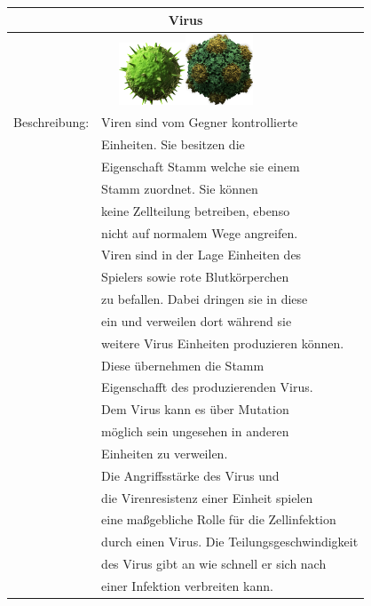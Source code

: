 \documentclass[11pt]{article}
\begin{document}
\begin{tabular}{|r|l|}
\hline
\multicolumn{2}{c}{Virus}\\\hline\hline
\multicolumn{2}{c}{\includegraphics[width=2cm]{virusaorig.png}\quad\quad\includegraphics[width=2cm]{virusborig.png}}\\\hline\hline
Beschreibung:	& Viren sind vom Gegner kontrollierte\\
			& Einheiten. Sie besitzen die\\
			& Eigenschaft Stamm welche sie einem\\
			& Stamm zuordnet. Sie k\"onnen\\
			& keine Zellteilung betreiben, ebenso\\
			& nicht auf normalem Wege angreifen.\\
			& Viren sind in der Lage Einheiten des\\
			& Spielers sowie rote Blutk\"orperchen\\
			& zu befallen. Dabei dringen sie in diese\\
			& ein und verweilen dort w\"ahrend sie\\
			& weitere Virus Einheiten produzieren können.\\
			& Diese \"ubernehmen die Stamm\\
			& Eigenschafft des produzierenden Virus.\\
			& Dem Virus kann es \"uber Mutation\\
			& m\"oglich sein ungesehen in anderen\\
			& Einheiten zu verweilen.\\
			& Die Angriffsst\"arke des Virus und\\
			& die Virenresistenz einer Einheit spielen\\
			& eine maßgebliche Rolle f\"ur die Zellinfektion\\
			& durch einen Virus. Die Teilungsgeschwindigkeit\\
			& des Virus gibt an wie schnell er sich nach\\
			& einer Infektion verbreiten kann.\\

\end{tabular}
\end{document}
